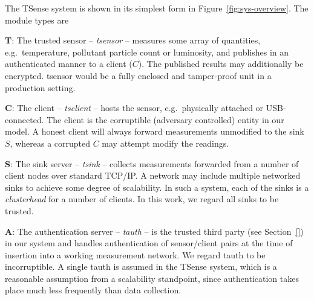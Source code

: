 The TSense system is shown in its simplest form in Figure~\ref{fig:sys-overview}. The module types are
%
\begin{description}

\item \textbf{T}: The trusted sensor -- \textit{tsensor} -- measures some array of quantities, e.g.\ temperature, pollutant particle count or luminosity, and publishes in an authenticated manner to a client ($C$). The published results may additionally be encrypted. tsensor would be a fully enclosed and tamper-proof unit in a production setting.

\item \textbf{C}: The client -- \textit{tsclient} -- hosts the sensor, e.g.\ physically attached or USB-connected. The client is the corruptible (adversary controlled) entity in our model. A honest client will always forward measurements unmodified to the sink $S$, whereas a corrupted $C$ may attempt modify the readings.

\item \textbf{S}: The sink server -- \textit{tsink} -- collects measurements forwarded from a number of client nodes over standard TCP/IP. A network may include multiple networked sinks to achieve some degree of scalability. In such a system, each of the sinks is a \textit{clusterhead} for a number of clients. In this work, we regard all sinks to be trusted. %

\item \textbf{A}: The authentication server -- \textit{tauth} -- is the trusted third party (see Section~\ref{}) in our system and handles authentication of sensor/client pairs at the time of insertion into a working measurement network. 
We regard tauth to be incorruptible. A single tauth is assumed in the TSense system, which is a reasonable assumption from a scalability standpoint, since authentication takes place much less frequently than data collection.

\end{description}

